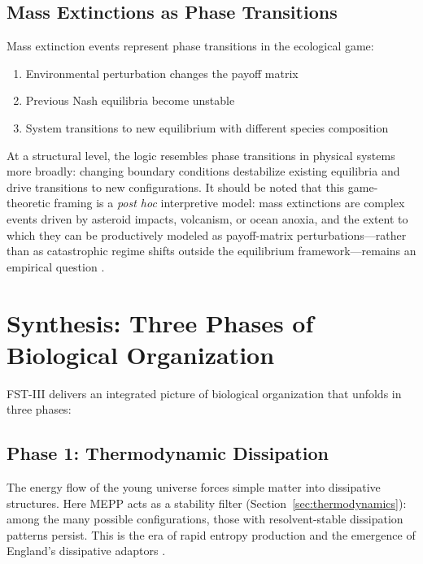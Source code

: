 \documentclass[12pt,a4paper]{article}
\theoremstyle{remark}
\begin{document}
\subsection{Mass Extinctions as Phase Transitions}

Mass extinction events represent phase transitions in the ecological game:
\begin{enumerate}
    \item Environmental perturbation changes the payoff matrix
    \item Previous Nash equilibria become unstable
    \item System transitions to new equilibrium with different species composition
\end{enumerate}

At a structural level, the logic resembles phase transitions in physical systems more broadly: changing boundary conditions destabilize existing equilibria and drive transitions to new configurations. It should be noted that this game-theoretic framing is a \emph{post hoc} interpretive model: mass extinctions are complex events driven by asteroid impacts, volcanism, or ocean anoxia, and the extent to which they can be productively modeled as payoff-matrix perturbations---rather than as catastrophic regime shifts outside the equilibrium framework---remains an empirical question \citep{GouldEldredge1977}.

\section{Synthesis: Three Phases of Biological Organization}
\label{sec:synthesis}

FST-III delivers an integrated picture of biological organization that unfolds in three phases:

\subsection{Phase 1: Thermodynamic Dissipation}

The energy flow of the young universe forces simple matter into dissipative structures. Here MEPP acts as a stability filter (Section~\ref{sec:thermodynamics}): among the many possible configurations, those with resolvent-stable dissipation patterns persist. This is the era of rapid entropy production and the emergence of England's dissipative adaptors \citep{EcosystemMEPP}.
\end{document}
